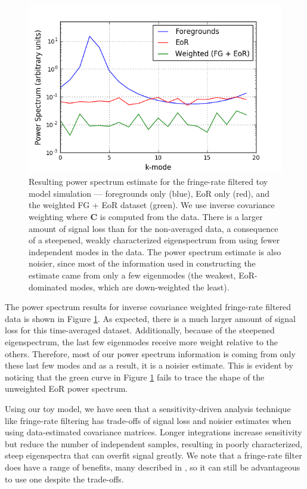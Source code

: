 \documentclass[preprint2,numberedappendix,tighten]{aastex6}  %
\begin{document}
\begin{figure}
	\centering
	\includegraphics[trim={0.3cm 0.2cm 0.3cm 0.3cm},clip,width=\columnwidth]{plots/toy_sigloss7.png}
	\caption{Resulting power spectrum estimate for the fringe-rate filtered toy model simulation --- foregrounds only (blue), EoR only (red), and the weighted FG + EoR dataset (green). We use inverse covariance weighting where $\textbf{C}$ is computed from the data. There is a larger amount of signal loss than for the non-averaged data, a consequence of a steepened, weakly characterized eigenspectrum from using fewer independent modes in the data. The power spectrum estimate is also noisier, since most of the information used in constructing the estimate came from only a few eigenmodes (the weakest, EoR-dominated modes, which are down-weighted the least).}
	\label{fig:toy_sigloss7}
\end{figure}

The power spectrum results for inverse covariance weighted fringe-rate filtered data is shown in Figure \ref{fig:toy_sigloss7}. As expected, there is a much larger amount of signal loss for this time-averaged dataset. Additionally, because of the steepened eigenspectrum, the last few eigenmodes receive more weight relative to the others. Therefore, most of our power spectrum information is coming from only these last few modes and as a result, it is a noisier estimate. This is evident by noticing that the green curve in Figure \ref{fig:toy_sigloss7} fails to trace the shape of the unweighted EoR power spectrum.

Using our toy model, we have seen that a sensitivity-driven analysis technique like fringe-rate filtering has trade-offs of signal loss and noisier estimates when using data-estimated covariance matrices. Longer integrations increase sensitivity but reduce the number of independent samples, resulting in poorly characterized, steep eigenspectra that can overfit signal greatly. We note that a fringe-rate filter does have a range of benefits, many described in \citet{parsons_et_al2016}, so it can still be advantageous to use one despite the trade-offs.
\end{document}
